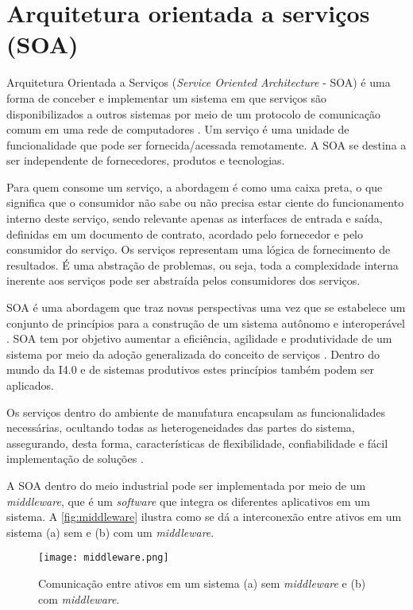 \section{Arquitetura orientada a serviços (SOA)}
\label{sec:soa}

Arquitetura Orientada a Serviços (\textit{Service Oriented Architecture} - SOA) é uma forma de conceber e implementar um sistema em que serviços são disponibilizados a outros sistemas por meio de um protocolo de comunicação comum em uma rede de computadores \cite{bell2008soa}. Um serviço é uma unidade de funcionalidade que pode ser fornecida/acessada remotamente. A SOA se destina a ser independente de fornecedores, produtos e tecnologias.

Para quem consome um serviço, a abordagem é como uma caixa preta, o que significa que o consumidor não sabe ou não precisa estar ciente do funcionamento interno deste serviço, sendo relevante apenas as interfaces de entrada e saída, definidas em um documento de contrato, acordado pelo fornecedor e pelo consumidor do serviço. Os serviços representam uma lógica de fornecimento de resultados. É uma abstração de problemas, ou seja, toda a complexidade interna inerente aos serviços pode ser abstraída pelos consumidores dos serviços.

SOA é uma abordagem que traz novas perspectivas uma vez que se estabelece um conjunto de princípios para a construção de um sistema autônomo e interoperável \cite{candido2009soa}. SOA tem por objetivo aumentar a eficiência, agilidade e produtividade de um sistema por meio da adoção generalizada do conceito de serviços \cite{souit2013soa}. Dentro do mundo da I4.0 e de sistemas produtivos estes princípios também podem ser aplicados.

Os serviços dentro do ambiente de manufatura encapsulam as funcionalidades necessárias, ocultando todas as heterogeneidades das partes do sistema, assegurando, desta forma, características de flexibilidade, confiabilidade e fácil implementação de	soluções \cite{groba2008soa}.

A SOA dentro do meio industrial pode ser implementada por meio de um \textit{middleware}, que é um \textit{software} que integra os diferentes aplicativos em um sistema. A \autoref{fig:middleware} ilustra como se dá a interconexão entre ativos em um sistema (a) sem e (b) com um \textit{middleware}.

\begin{figure}[htb]
	\centering
	\texttt{[image: middleware.png]}
	\caption{Comunicação entre ativos em um sistema (a) sem \textit{middleware} e (b) com \textit{middleware}.}
	\label{fig:middleware}
\end{figure}

